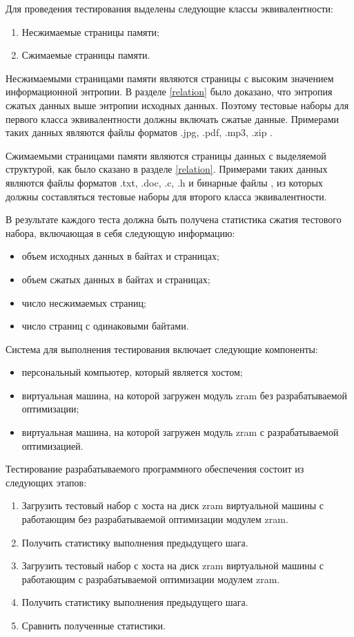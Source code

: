 Для проведения тестирования выделены следующие классы эквивалентности:

\begin{enumerate}
	\item Несжимаемые страницы памяти;
	\item Сжимаемые страницы памяти.
\end{enumerate}

Несжимаемыми страницами памяти являются страницы с высоким значением информационной энтропии. В разделе \ref{relation} было доказано, что энтропия сжатых данных выше энтропии исходных данных. Поэтому тестовые наборы для первого класса эквивалентности должны включать сжатые данные. Примерами таких данных являются файлы форматов .jpg, .pdf, .mp3, .zip \cite{formats}.

Сжимаемыми страницами памяти являются страницы данных с выделяемой структурой, как было сказано в разделе \ref{relation}. Примерами таких данных являются файлы форматов .txt, .doc, .c, .h и бинарные файлы \cite{good-compression}, из которых должны составляться тестовые наборы для второго класса эквивалентности.

В результате каждого теста должна быть получена статистика сжатия тестового набора, включающая в себя следующую информацию:

\begin{itemize}
	\item объем исходных данных в байтах и страницах;
	\item объем сжатых данных в байтах и страницах;
	\item число несжимаемых страниц;
	\item число страниц с одинаковыми байтами.
\end{itemize}

Система для выполнения тестирования включает следующие компоненты:

\begin{itemize}
	\item персональный компьютер, который является хостом;
	\item виртуальная машина, на которой загружен модуль zram без разрабатываемой оптимизации;
	\item виртуальная машина, на которой загружен модуль zram с разрабатываемой оптимизацией.
\end{itemize}

Тестирование разрабатываемого программного обеспечения состоит из следующих этапов:

\begin{enumerate}
	\item Загрузить тестовый набор с хоста на диск zram виртуальной машины с работающим без разрабатываемой оптимизации модулем zram.
	\item Получить статистику выполнения предыдущего шага.
	\item Загрузить тестовый набор с хоста на диск zram виртуальной машины с работающим с разрабатываемой оптимизации модулем zram.
	\item Получить статистику выполнения предыдущего шага.
	\item Сравнить полученные статистики.
\end{enumerate}

